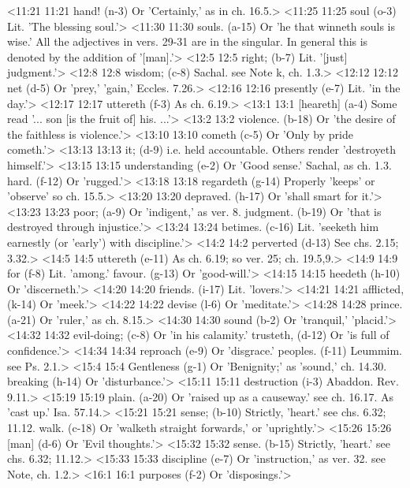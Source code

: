 <11:21 11:21  hand! (n-3)  Or 'Certainly,' as in ch. 16.5.>
<11:25 11:25  soul (o-3)  Lit. 'The blessing soul.'>
<11:30 11:30  souls. (a-15)  Or 'he that winneth souls is wise.' All the adjectives in  vers. 29-31 are in the singular. In general this is denoted by  the addition of '[man].'>
<12:5 12:5  right; (b-7)  Lit. '[just] judgment.'>
<12:8 12:8  wisdom; (c-8)  Sachal. see Note k, ch. 1.3.>
<12:12 12:12  net (d-5)  Or 'prey,' 'gain,' Eccles. 7.26.>
<12:16 12:16  presently (e-7)  Lit. 'in the day.'>
<12:17 12:17  uttereth (f-3)  As ch. 6.19.>
<13:1 13:1  [heareth] (a-4)  Some read '... son [is the fruit of] his. ...'>
<13:2 13:2  violence. (b-18)  Or 'the desire of the faithless is violence.'>
<13:10 13:10  cometh (c-5)  Or 'Only by pride cometh.'>
<13:13 13:13  it; (d-9)  i.e. held accountable. Others render 'destroyeth himself.'>
<13:15 13:15  understanding (e-2)  Or 'Good sense.' Sachal, as ch. 1.3.
  hard. (f-12)  Or 'rugged.'>
<13:18 13:18  regardeth (g-14)  Properly 'keeps' or 'observe' so ch. 15.5.>
<13:20 13:20  depraved. (h-17)  Or 'shall smart for it.'>
<13:23 13:23  poor; (a-9)  Or 'indigent,' as ver. 8.
  judgment. (b-19)  Or 'that is destroyed through injustice.'>
<13:24 13:24  betimes. (c-16)  Lit. 'seeketh him earnestly (or 'early') with discipline.'>
<14:2 14:2  perverted (d-13)  See chs. 2.15; 3.32.>
<14:5 14:5  uttereth (e-11)  As ch. 6.19; so ver. 25; ch. 19.5,9.>
<14:9 14:9  for (f-8)  Lit. 'among.'
  favour. (g-13)  Or 'good-will.'>
<14:15 14:15  heedeth (h-10)  Or 'discerneth.'>
<14:20 14:20  friends. (i-17)  Lit. 'lovers.'>
<14:21 14:21  afflicted, (k-14)  Or 'meek.'>
<14:22 14:22  devise (l-6)  Or 'meditate.'>
<14:28 14:28  prince. (a-21)  Or 'ruler,' as ch. 8.15.>
<14:30 14:30  sound (b-2)  Or 'tranquil,' 'placid.'>
<14:32 14:32  evil-doing; (c-8)  Or 'in his calamity.'
  trusteth, (d-12)  Or 'is full of confidence.'>
<14:34 14:34  reproach (e-9)  Or 'disgrace.'
  peoples. (f-11)  Leummim. see Ps. 2.1.>
<15:4 15:4  Gentleness (g-1)  Or 'Benignity;' as 'sound,' ch. 14.30.
  breaking (h-14)  Or 'disturbance.'>
<15:11 15:11  destruction (i-3)  Abaddon. Rev. 9.11.>
<15:19 15:19  plain. (a-20)  Or 'raised up as a causeway.' see ch. 16.17. As 'cast up.'  Isa. 57.14.>
<15:21 15:21  sense; (b-10) Strictly, 'heart.' see chs. 6.32; 11.12.
  walk. (c-18)  Or 'walketh straight forwards,' or 'uprightly.'>
<15:26 15:26  [man] (d-6)  Or 'Evil thoughts.'>
<15:32 15:32  sense. (b-15)  Strictly, 'heart.' see chs. 6.32; 11.12.>
<15:33 15:33  discipline (e-7)  Or 'instruction,' as ver. 32. see Note, ch. 1.2.>
<16:1 16:1  purposes (f-2)  Or 'disposings.'>
